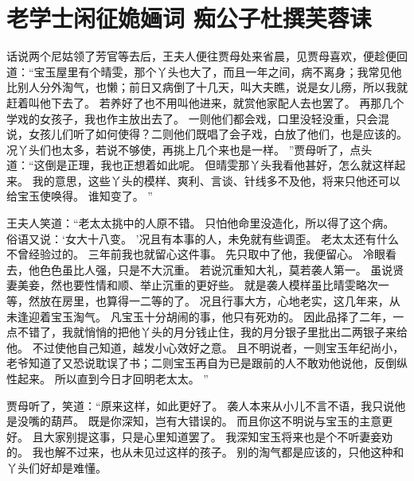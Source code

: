 \chapter{老学士闲征姽婳词 \quad 痴公子杜撰芙蓉诔}
\par
{}\par
话说两个尼姑领了芳官等去后，王夫人便往贾母处来省晨，见贾母喜欢，便趁便回道：“宝玉屋里有个晴雯，那个丫头也大了，而且一年之间，病不离身；我常见他比别人分外淘气，也懒；前日又病倒了十几天，叫大夫瞧，说是女儿痨，所以我就赶着叫他下去了。
若养好了也不用叫他进来，就赏他家配人去也罢了。
再那几个学戏的女孩子，我也作主放出去了。
一则他们都会戏，口里没轻没重，只会混说，女孩儿们听了如何使得？二则他们既唱了会子戏，白放了他们，也是应该的。
况丫头们也太多，若说不够使，再挑上几个来也是一样。
”贾母听了，点头道：“这倒是正理，我也正想着如此呢。
但晴雯那丫头我看他甚好，怎么就这样起来。
我的意思，这些丫头的模样、爽利、言谈、针线多不及他，将来只他还可以给宝玉使唤得。
谁知变了。
”\par
王夫人笑道：“老太太挑中的人原不错。
只怕他命里没造化，所以得了这个病。
俗语又说：‘女大十八变。
’况且有本事的人，未免就有些调歪。
老太太还有什么不曾经验过的。
三年前我也就留心这件事。
先只取中了他，我便留心。
冷眼看去，他色色虽比人强，只是不大沉重。
若说沉重知大礼，莫若袭人第一。
虽说贤妻美妾，然也要性情和顺、举止沉重的更好些。
就是袭人模样虽比晴雯略次一等，然放在房里，也算得一二等的了。
况且行事大方，心地老实，这几年来，从未逢迎着宝玉淘气。
凡宝玉十分胡闹的事，他只有死劝的。
因此品择了二年，一点不错了，我就悄悄的把他丫头的月分钱止住，我的月分银子里批出二两银子来给他。
不过使他自己知道，越发小心效好之意。
且不明说者，一则宝玉年纪尚小，老爷知道了又恐说耽误了书；二则宝玉再自为已是跟前的人不敢劝他说他，反倒纵性起来。
所以直到今日才回明老太太。
”\par
贾母听了，笑道：“原来这样，如此更好了。
袭人本来从小儿不言不语，我只说他是没嘴的葫芦。
既是你深知，岂有大错误的。
而且你这不明说与宝玉的主意更好。
且大家别提这事，只是心里知道罢了。
我深知宝玉将来也是个不听妻妾劝的。
我也解不过来，也从未见过这样的孩子。
别的淘气都是应该的，只他这种和丫头们好却是难懂。
